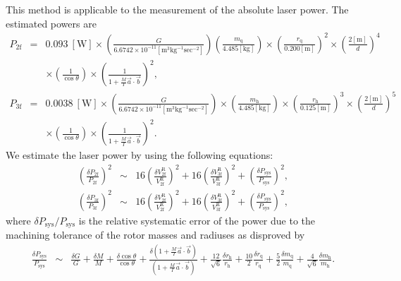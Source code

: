 \documentclass[A4]{spie}  %
\begin{document}
This method is applicable to the measurement of the absolute laser power. The estimated powers are
\footnotesize
\begin{eqnarray}
P_{\mathrm{2f}}&=&0.093 ~\mathrm{[W]}\times \left( \frac{G}{6.6742 \times 10^{-11} \mathrm{[m^3kg^{-1}sec^{-2}]}} \right)  \left( \frac{m_{\mathrm{q}}}{4.485 \mathrm{[kg]}} \right) \times \left( \frac{r_{\mathrm{q}}}{0.200 \mathrm{[m]}} \right)^2 \times \left( \frac{2\mathrm{[m]}}{d} \right)^4 \nonumber \\ &&\times \left( \frac{1}{\cos{\theta}} \right) \times \left( \frac{1}{1+\frac{M}{I}\vec{a}\cdot \vec{b}} \right)^2,\\
P_{\mathrm{3f}}&=&0.0038~\mathrm{[W]} \times \left( \frac{G}{6.6742 \times 10^{-11} \mathrm{[m^3kg^{-1}sec^{-2}]}} \right)  \times \left( \frac{m_{\mathrm{h}}}{4.485 \mathrm{[kg]}} \right) \times \left( \frac{r_{\mathrm{h}}}{0.125 \mathrm{[m]}} \right)^3 \times \left( \frac{2\mathrm{[m]}}{d} \right)^5 \nonumber \\ &&\times \left( \frac{1}{\cos{\theta}} \right) \times \left( \frac{1}{1+\frac{M}{I}\vec{a}\cdot \vec{b}} \right)^2.
\end{eqnarray}
\normalsize
We estimate the laser power by using the following equations:
\footnotesize
\begin{eqnarray}
\left( \frac{\delta P_{\mathrm{2f}}}{P_{\mathrm{2f}}} \right)^2 &\sim&  \!16 \! \left( \frac{\delta V^{\mathrm{R}}_{{\mathrm{2f}}}}{V^{\mathrm{R}}_{{\mathrm{2f}}}} \!\right)^2+16\left( \frac{\delta V^{\mathrm{R}}_{{\mathrm{3f}}}}{V^{\mathrm{R}}_{{\mathrm{3f}}}} \right)^2 +\left( \frac{\delta P_{\mathrm{sys}}}{P_{\mathrm{sys}}} \right)^2, \label{dP2f} \\ 
\left( \frac{\delta P_{\mathrm{3f}}}{P_{\mathrm{3f}}} \right)^2 &\sim&  \!16 \! \left( \frac{\delta V^{\mathrm{R}}_{{\mathrm{2f}}}}{V^{\mathrm{R}}_{{\mathrm{2f}}}} \right)^2+16\left( \frac{\delta V^{\mathrm{R}}_{{\mathrm{3f}}}}{V^{\mathrm{R}}_{{\mathrm{3f}}}} \right)^2+\left( \frac{\delta P_{\mathrm{sys}}}{P_{\mathrm{sys}}} \right)^2,  \label{dP3f}
\end{eqnarray}
\normalsize
where $\delta P_{\mathrm{sys}}/P_{\mathrm{sys}}$ is the relative systematic error  of the power due to the machining tolerance of the rotor masses and radiuses as disproved by
\begin{eqnarray}
\frac{\delta P_{\mathrm{sys}}}{P_{\mathrm{sys}}}&\sim& \frac{\delta G}{G} + \frac{\delta M}{M} +\frac{\delta \cos{\theta}}{\cos{\theta}}+ \frac{\delta\left( 1+\frac{M}{I}\vec{a}\cdot \vec{b} \right)}{\! \left( \! 1+\frac{M}{I}\vec{a}\cdot \vec{b} \! \right)} +\frac{12}{\sqrt{6}} \frac{\delta r_{\mathrm{h}}}{r_{\mathrm{h}}} +\frac{10}{2} \frac{\delta r_{\mathrm{q}}}{r_{\mathrm{q}}}  +\frac{5}{2} \frac{\delta m_{\mathrm{q}}}{m_{\mathrm{q}}} +\!\frac{4}{\sqrt{6}}  \! \frac{\delta m_{\mathrm{h}}}{m_{\mathrm{h}}}.
\end{eqnarray}
\end{document}
